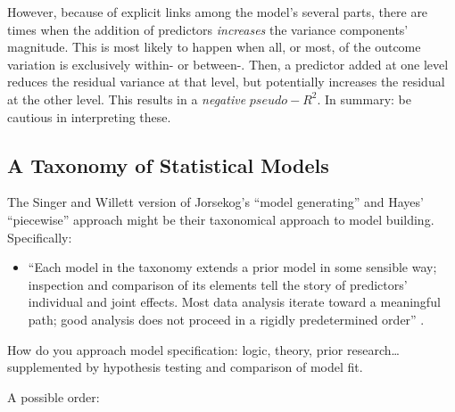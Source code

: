 \documentclass[
  11pt,
]{book}
\providecommand{\tightlist}{%
  \setlength{\itemsep}{0pt}\setlength{\parskip}{0pt}}
\begin{document}
However, because of explicit links among the model's several parts, there are times when the addition of predictors \emph{increases} the variance components' magnitude. This is most likely to happen when all, or most, of the outcome variation is exclusively within- or between-. Then, a predictor added at one level reduces the residual variance at that level, but potentially increases the residual at the other level. This results in a \emph{negative} \(pseudo-R^2\). In summary: be cautious in interpreting these.

\hypertarget{a-taxonomy-of-statistical-models}{%
\subsection{A Taxonomy of Statistical Models}\label{a-taxonomy-of-statistical-models}}

The Singer and Willett \citeyearpar{singer_applied_2003} version of Jorsekog's \citeyearpar{bollen_testing_1993} ``model generating'' and Hayes' \citeyearpar{hayes_introduction_2018} ``piecewise'' approach might be their taxonomical approach to model building. Specifically:

\begin{itemize}
\tightlist
\item
  ``Each model in the taxonomy extends a prior model in some sensible way; inspection and comparison of its elements tell the story of predictors' individual and joint effects. Most data analysis iterate toward a meaningful path; good analysis does not proceed in a rigidly predetermined order'' \citep[p.~105]{singer_applied_2003}.
\end{itemize}

How do you approach model specification: logic, theory, prior research\ldots supplemented by hypothesis testing and comparison of model fit.

A possible order:
\end{document}
